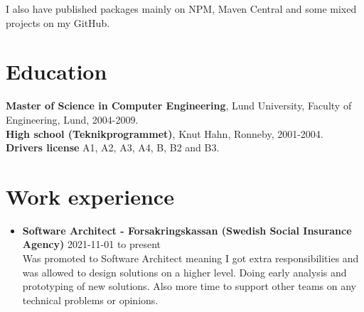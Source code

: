 \documentclass[a4paper]{article}
\begin{document}
I also have published packages mainly on NPM, Maven Central and some mixed projects on my GitHub.


\section*{Education}
\textbf{Master of Science in Computer Engineering}, Lund University, Faculty of Engineering, Lund, 2004-2009. \\
\textbf{High school (Teknikprogrammet)}, Knut Hahn, Ronneby, 2001-2004. \\
\textbf{Drivers license} A1, A2, A3, A4, B, B2 and B3. \\
\newpage 
  

\section*{Work experience}
\begin{itemize}
  \item \textbf{Software Architect - Forsakringskassan (Swedish Social Insurance Agency)} 2021-11-01 to present \\

  Was promoted to Software Architect meaning I got extra responsibilities and was allowed to design solutions on a higher level. Doing early analysis and prototyping of new solutions. Also more time to support other teams on any technical problems or opinions.

\end{itemize}
\end{document}

